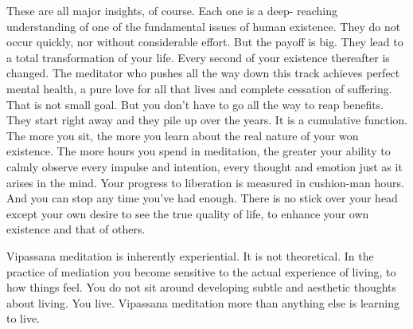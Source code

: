 These are all major insights, of course. Each one is a deep- reaching
understanding of one of the fundamental issues of human existence. They do not
occur quickly, nor without considerable effort. But the payoff is big. They lead
to a total transformation of your life. Every second of your existence
thereafter is changed. The meditator who pushes all the way down this track
achieves perfect mental health, a pure love for all that lives and complete
cessation of suffering. That is not small goal. But you don't have to go all the
way to reap benefits. They start right away and they pile up over the years. It
is a cumulative function. The more you sit, the more you learn about the real nature of your won
existence. The more hours you spend in meditation, the greater your ability to
calmly observe every impulse and intention, every thought and emotion just as it
arises in the mind. Your progress to liberation is measured in cushion-man
hours. And you can stop any time you've had enough. There is no stick over your
head except your own desire to see the true quality of life, to enhance your own
existence and that of others.

Vipassana meditation is inherently experiential. It is not theoretical. In the
practice of mediation you become sensitive to the actual experience of living,
to how things feel. You do not sit around developing subtle and aesthetic
thoughts about living. You live. Vipassana meditation more than anything else is
learning to live.